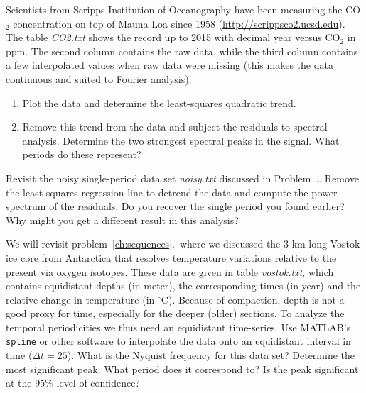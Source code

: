 \begin{problem}
	Scientists from Scripps Institution of Oceanography have been measuring the CO$_2$ concentration on top of Mauna Loa since 1958 (\url{http://scrippsco2.ucsd.edu}). The
	table \emph{CO2.txt} shows the record up to 2015 with decimal year versus CO$_2$ in ppm.  The second column
	contains the raw data, while the third column contains a few interpolated values when raw data were missing (this
	makes the data continuous and suited to Fourier analysis).
	\begin{enumerate}[label=\alph*)]
		\item Plot the data and determine the least-squares quadratic trend.
		\item Remove this trend from the data and subject the residuals to spectral analysis.
		Determine the two strongest spectral peaks in the signal.  What periods do these represent?
	\end{enumerate}
\end{problem}

\begin{problem}
	Revisit the noisy single-period data set \emph{noisy.txt} discussed in Problem~\thenoisyc.\thenoisyp.
	Remove the least-squares regression line to detrend the data
	and compute the power spectrum of the residuals.  Do you recover the single period you
	found earlier? Why might you get a different result in this analysis?
\end{problem}

\begin{problem}
	We will revisit problem~\ref{ch:sequences}.\theVostok\ where we discussed
	the 3-km long Vostok ice core from Antarctica that resolves temperature variations relative to the present via
	oxygen isotopes. These data are given in table \emph{vostok.txt}, which contains equidistant depths (in meter), the
	corresponding times (in year) and the relative change in temperature (in $^{\circ}$C).
	Because of compaction, depth is not a good proxy for time, especially for the deeper (older) sections.
	To analyze the temporal periodicities we thus need an equidistant time-series. Use MATLAB's \texttt{spline}
	or other software to interpolate the data onto an equidistant interval in time ($\Delta t = 25$).  
	What is the Nyquist frequency for this data set? Determine the most significant peak.  What period does it correspond to?
	Is the peak significant at the 95\% level of confidence?
\end{problem}
